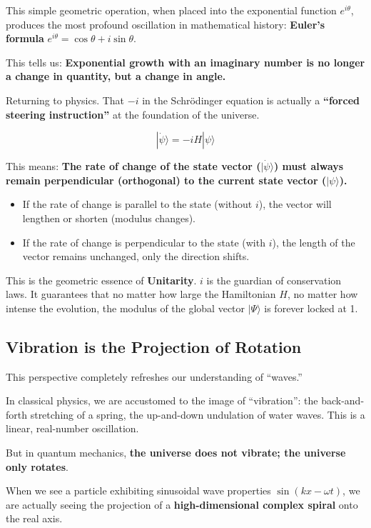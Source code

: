 \documentclass[11pt,a4paper,twoside]{book}
\begin{document}
This simple geometric operation, when placed into the exponential function $e^{i\theta}$, produces the most profound oscillation in mathematical history: \textbf{Euler's formula} $e^{i\theta} = \cos\theta + i\sin\theta$.

This tells us: \textbf{Exponential growth with an imaginary number is no longer a change in quantity, but a change in angle.}

Returning to physics. That $-i$ in the Schrödinger equation is actually a \textbf{``forced steering instruction''} at the foundation of the universe.

$$|\dot{\psi}\rangle = -i H |\psi\rangle$$

This means: \textbf{The rate of change of the state vector ($|\dot{\psi}\rangle$) must always remain perpendicular (orthogonal) to the current state vector ($|\psi\rangle$).}

\begin{itemize}
\item If the rate of change is parallel to the state (without $i$), the vector will lengthen or shorten (modulus changes).

\item If the rate of change is perpendicular to the state (with $i$), the length of the vector remains unchanged, only the direction shifts.
\end{itemize}

This is the geometric essence of \textbf{Unitarity}. $i$ is the guardian of conservation laws. It guarantees that no matter how large the Hamiltonian $H$, no matter how intense the evolution, the modulus of the global vector $|\Psi\rangle$ is forever locked at 1.

\subsection{Vibration is the Projection of Rotation}

This perspective completely refreshes our understanding of ``waves.''

In classical physics, we are accustomed to the image of ``vibration'': the back-and-forth stretching of a spring, the up-and-down undulation of water waves. This is a linear, real-number oscillation.

But in quantum mechanics, \textbf{the universe does not vibrate; the universe only rotates}.

When we see a particle exhibiting sinusoidal wave properties $\sin(kx - \omega t)$, we are actually seeing the projection of a \textbf{high-dimensional complex spiral} onto the real axis.
\end{document}
